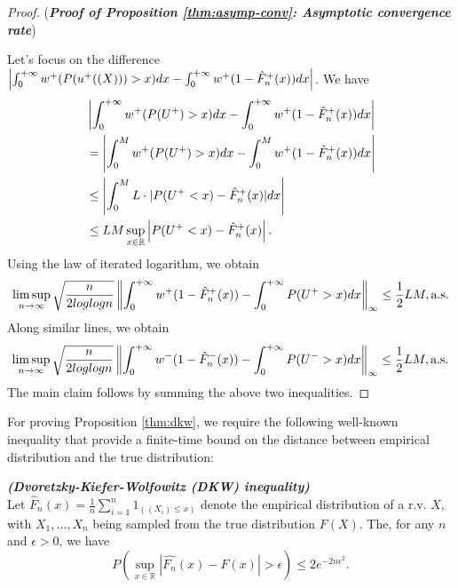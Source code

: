 \begin{proof}(\textbf{\textit{Proof of Proposition \ref{thm:asymp-conv}: Asymptotic convergence rate}})

Let's focus on the difference 
$
\left|
\int_0^{+\infty} w^{+}(P(u^+((X)))>x) dx- \int_0^{+\infty} w^+(1-{\hat F_n}^+(x)) dx
\right|
$. We have
\begin{align*}
&
\left|
\int_0^{+\infty} w^{+}(P(U^+)>x) dx- \int_0^{+\infty} w^+(1-{\hat F_n}^+(x)) dx
\right|
\\
&
=
\left|
\int_0^M w^{+}(P(U^+)>x) dx- \int_0^M w^+(1-{\hat F_n}^+(x)) dx
\right|
\\
&
\leq
\left|
\int_0^M L\cdot |P(U^+<x)-{\hat F_n}^+(x)| dx
\right|
\\
&
\leq
LM
\sup_{x\in \mathbb{R}}
\left|
P(U^+<x)-{\hat F_n}^+(x)
\right|.
\end{align*}
Using the law of iterated logarithm, we obtain 
$$
\limsup_{n\rightarrow \infty} \sqrt{\frac{n}{2log log n}} \left\|\int_0^{+\infty} w^+(1-{\hat F_n}^+(x))- \int_0^{+\infty} P(U^+>x)dx\right\|_{\infty} 
\leq \frac{1}{2} LM, \text{a.s.}
$$
Along similar lines, we obtain 
$$
\limsup_{n\rightarrow \infty} \sqrt{\frac{n}{2log log n}} \left\|\int_0^{+\infty} w^{-}(1-{\hat F_n}^-(x))- \int_0^{+\infty} P(U^->x)dx\right\|_{\infty} 
\leq \frac{1}{2} LM, \text{a.s.}
$$
The main claim follows by summing the above two inequalities. 
\end{proof}


For proving Proposition \ref{thm:dkw}, we require the following well-known inequality that provide a finite-time bound on the distance between empirical distribution and the true distribution:
\begin{lemma}{\textbf{\textit{(Dvoretzky-Kiefer-Wolfowitz (DKW) inequality)}}}\\
Let ${\hat F_n}(x)=\frac{1}{n} \sum_{i=1}^n 1_{((X_i) \leq x)}$ denote the empirical distribution of a r.v. $X$, with $X_1,\ldots,X_n$ being sampled from the true distribution $F(X)$.
The, for any $n$ and $\epsilon>0$, we have
$$
P(\sup_{x\in \mathbb{R}}|\hat{F_n}(x)-F(x)|>\epsilon ) \leq 2 e^{-2n\epsilon^2}.
$$
\end{lemma}

